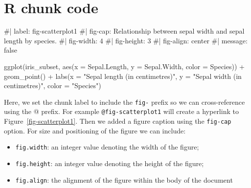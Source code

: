 \documentclass[
  letterpaper,
  DIV=11,
  numbers=noendperiod]{scrartcl}
\newenvironment{Shaded}{\begin{snugshade}}{\end{snugshade}}
\newcommand{\AttributeTok}[1]{\textcolor[rgb]{0.40,0.45,0.13}{#1}}
\newcommand{\CommentTok}[1]{\textcolor[rgb]{0.37,0.37,0.37}{#1}}
\newcommand{\FunctionTok}[1]{\textcolor[rgb]{0.28,0.35,0.67}{#1}}
\newcommand{\NormalTok}[1]{\textcolor[rgb]{0.00,0.23,0.31}{#1}}
\newcommand{\SpecialCharTok}[1]{\textcolor[rgb]{0.37,0.37,0.37}{#1}}
\newcommand{\StringTok}[1]{\textcolor[rgb]{0.13,0.47,0.30}{#1}}
\providecommand{\tightlist}{%
  \setlength{\itemsep}{0pt}\setlength{\parskip}{0pt}}\usepackage{longtable,booktabs,array}
\begin{document}
\section{R chunk code}

\begin{Shaded}
\begin{Highlighting}[]
\CommentTok{\#| label: fig{-}scatterplot1}
\CommentTok{\#| fig{-}cap: Relationship between sepal width and sepal length by species.}
\CommentTok{\#| fig{-}width: 4}
\CommentTok{\#| fig{-}height: 3}
\CommentTok{\#| fig{-}align: center}
\CommentTok{\#| message: false}


\FunctionTok{ggplot}\NormalTok{(iris\_subset, }\FunctionTok{aes}\NormalTok{(}\AttributeTok{x =}\NormalTok{ Sepal.Length, }\AttributeTok{y =}\NormalTok{ Sepal.Width, }\AttributeTok{color =}\NormalTok{ Species)) }\SpecialCharTok{+}
  \FunctionTok{geom\_point}\NormalTok{() }\SpecialCharTok{+}
  \FunctionTok{labs}\NormalTok{(}\AttributeTok{x =} \StringTok{"Sepal length (in centimetres)"}\NormalTok{, }\AttributeTok{y =} \StringTok{"Sepal width (in centimetres)"}\NormalTok{, }\AttributeTok{color =} \StringTok{"Species"}\NormalTok{) }
\end{Highlighting}
\end{Shaded}

Here, we set the chunk label to include the \texttt{fig-} prefix so we
can cross-reference using the @ prefix. For example
\texttt{@fig-scatterplot1} will create a hyperlink to
Figure~\ref{fig-scatterplot1}. Then we added a figure caption using the
\texttt{fig-cap} option. For size and positioning of the figure we can
include:

\begin{itemize}
\tightlist
\item
  \texttt{fig.width}: an integer value denoting the width of the figure;
\item
  \texttt{fig.height}: an integer value denoting the height of the
  figure;
\item
  \texttt{fig.align}: the alignment of the figure within the body of the
  document
\end{itemize}
\end{document}
